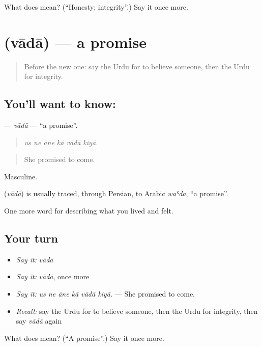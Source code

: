 \begin{tcolorbox}[breakable,colback=teal!4,colframe=teal!35!black,title={Before you move on}]
What does  mean? (\textquotedblleft{}Honesty; integrity\textquotedblright{}.) Say it once more.
\end{tcolorbox}
\section[\texorpdfstring{\ur{وعدہ} (vādā)}{وعدہ (vādā)}]{ (vādā) — a promise}

\label{lesson:UR-C457-vada}



\begin{quote}
Before the new one: say the Urdu for to believe someone, then the Urdu for integrity.
\end{quote}

\subsection*{You'll want to know: }
\textbf{} — \emph{vādā} — \textquotedblleft{}a promise\textquotedblright{}.

\begin{quote}
     
\end{quote}

\begin{quote}
\emph{us ne āne kā vādā kiyā.}
\end{quote}

\begin{quote}
She promised to come.
\end{quote}

Masculine.

\begin{cousinweb}
\textbf{} (\emph{vādā}) is usually traced, through Persian, to Arabic \emph{waʿda}, \textquotedblleft{}a promise\textquotedblright{}.
\end{cousinweb}

\begin{grammarlens}[title={What you've built}]
One more word for describing what you lived and felt.
\end{grammarlens}

\subsection*{Your turn}
\begin{itemize}
\raggedright
  \item \emph{Say it:} \emph{vādā}
  \item \emph{Say it:} \emph{vādā}, once more
  \item \emph{Say it:} \emph{us ne āne kā vādā kiyā.} — She promised to come.
  \item \emph{Recall:} say the Urdu for to believe someone, then the Urdu for integrity, then say \emph{vādā} again
\end{itemize}

\begin{tcolorbox}[breakable,colback=teal!4,colframe=teal!35!black,title={Before you move on}]
What does  mean? (\textquotedblleft{}A promise\textquotedblright{}.) Say it once more.
\end{tcolorbox}
